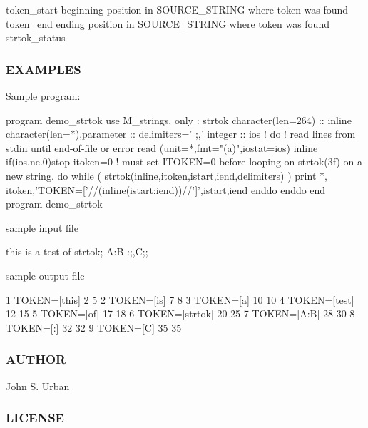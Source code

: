 token\+\_\+start beginning position in S\+O\+U\+R\+C\+E\+\_\+\+S\+T\+R\+I\+NG where token was found token\+\_\+end ending position in S\+O\+U\+R\+C\+E\+\_\+\+S\+T\+R\+I\+NG where token was found strtok\+\_\+status

\subsubsection*{E\+X\+A\+M\+P\+L\+ES}

Sample program\+: \begin{DoxyVerb} program demo_strtok
 use M_strings, only : strtok
 character(len=264)          :: inline
 character(len=*),parameter  :: delimiters=' ;,'
 integer                     :: ios
 !
    do                        ! read lines from stdin until end-of-file or error
       read (unit=*,fmt="(a)",iostat=ios) inline
       if(ios.ne.0)stop
       itoken=0 ! must set ITOKEN=0 before looping on strtok(3f) on a new string.
       do while ( strtok(inline,itoken,istart,iend,delimiters) )
          print *, itoken,'TOKEN=['//(inline(istart:iend))//']',istart,iend
       enddo
    enddo
 end program demo_strtok
\end{DoxyVerb}


sample input file \begin{DoxyVerb}  this is a test of strtok; A:B :;,C;;
\end{DoxyVerb}


sample output file \begin{DoxyVerb} 1  TOKEN=[this]    2   5
 2  TOKEN=[is]      7   8
 3  TOKEN=[a]       10  10
 4  TOKEN=[test]    12  15
 5  TOKEN=[of]      17  18
 6  TOKEN=[strtok]  20  25
 7  TOKEN=[A:B]     28  30
 8  TOKEN=[:]       32  32
 9  TOKEN=[C]       35  35
\end{DoxyVerb}


\subsubsection*{A\+U\+T\+H\+OR}

John S. Urban \subsubsection*{L\+I\+C\+E\+N\+SE}

